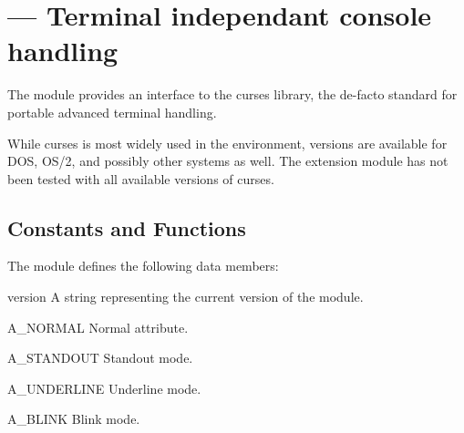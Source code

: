 \section{ ---
         Terminal independant console handling}


The  module provides an interface to the curses \UNIX{}
library, the de-facto standard for portable advanced terminal
handling.

While curses is most widely used in the \UNIX{} environment, versions
are available for DOS, OS/2, and possibly other systems as well.  The
extension module has not been tested with all available versions of
curses.

\begin{seealso}
\end{seealso}


\subsection{Constants and Functions \label{curses-functions}}

The  module defines the following data members:

\begin{datadesc}{version}
A string representing the current version of the module.
\end{datadesc}

\begin{datadesc}{A_NORMAL}
Normal attribute.
\end{datadesc}

\begin{datadesc}{A_STANDOUT}
Standout mode.
\end{datadesc}

\begin{datadesc}{A_UNDERLINE}
Underline mode.
\end{datadesc}

\begin{datadesc}{A_BLINK}
Blink mode.
\end{datadesc}

